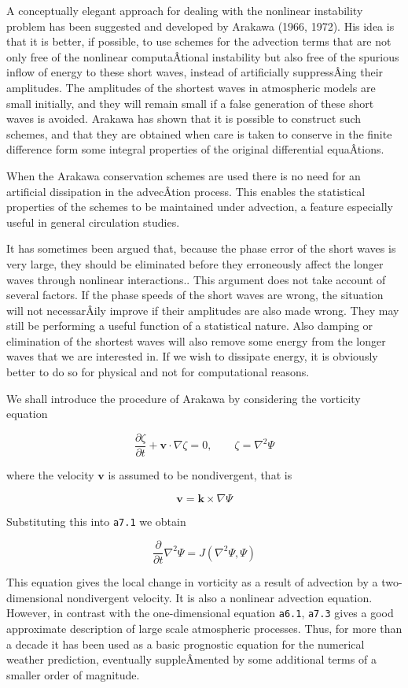 A conceptually elegant approach for dealing with the nonlinear
instability problem has been suggested and developed by Arakawa (1966,
1972). His idea is that it is better, if possible, to use schemes for
the advection terms that are not only free of the nonlinear
computaÂ­tional instability but also free of the spurious inflow of
energy to these short waves, instead of artificially suppressÂ­ing their
amplitudes. The amplitudes of the shortest waves in atmospheric models
are small initially, and they will remain small if a false generation of
these short waves is avoided. Arakawa has shown that it is possible to
construct such schemes, and that they are obtained when care is taken to
conserve in the finite difference form some integral properties of the
original differential equaÂ­tions.

When the Arakawa conservation schemes are used there is no need for an
artificial dissipation in the advecÂ­tion process. This enables the
statistical properties of the schemes to be maintained under advection,
a feature especially useful in general circulation studies.

It has sometimes been argued that, because the phase error of the short
waves is very large, they should be eliminated before they erroneously
affect the longer waves through nonlinear interactions.. This argument
does not take account of several factors. If the phase speeds of the
short waves are wrong, the situation will not necessarÂ­ily improve if
their amplitudes are also made wrong. They may still be performing a
useful function of a statistical nature. Also damping or elimination of
the shortest waves will also remove some energy from the longer waves
that we are interested in. If we wish to dissipate energy, it is
obviously better to do so for physical and not for computational
reasons.

We shall introduce the procedure of Arakawa by considering the vorticity
equation

{\[\frac{\partial\zeta}{\partial t} + \textbf{v} \cdot\nabla\zeta = 0,\qquad \zeta = \nabla^{2}\Psi\]}

where the velocity \(\textbf{v}\) is assumed to be nondivergent, that is

{\[\textbf{v} = \textbf{k} \times \nabla\Psi\]}

Substituting this into \texttt{a7.1} we obtain

{\[\frac{\partial}{\partial t}\nabla^{2}\Psi = J\left( \nabla^2\Psi, \Psi \right)\]}

This equation gives the local change in vorticity as a result of
advection by a two-dimensional nondivergent velocity. It is also a
nonlinear advection equation. However, in contrast with the
one-dimensional equation \texttt{a6.1}, \texttt{a7.3} gives a good
approximate description of large scale atmospheric processes. Thus, for
more than a decade it has been used as a basic prognostic equation for
the numerical weather prediction, eventually suppleÂ­mented by some
additional terms of a smaller order of magnitude.


